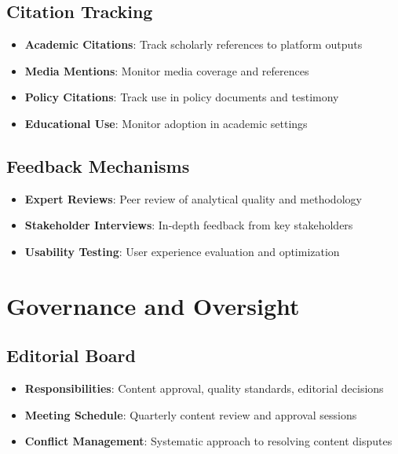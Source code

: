 \documentclass[11pt,a4paper]{article}
\begin{document}
\subsection{Citation Tracking}
\begin{itemize}
    \item \textbf{Academic Citations}: Track scholarly references to platform outputs
    \item \textbf{Media Mentions}: Monitor media coverage and references
    \item \textbf{Policy Citations}: Track use in policy documents and testimony
    \item \textbf{Educational Use}: Monitor adoption in academic settings
\end{itemize}

\subsection{Feedback Mechanisms}
\begin{itemize}
    \textbf{User Surveys}: Regular satisfaction and needs assessment surveys
    \item \textbf{Expert Reviews}: Peer review of analytical quality and methodology
    \item \textbf{Stakeholder Interviews}: In-depth feedback from key stakeholders
    \item \textbf{Usability Testing}: User experience evaluation and optimization
\end{itemize}

\section{Governance and Oversight}

\subsection{Editorial Board}
\begin{itemize}
    \textbf{Composition}: Senior economists, methodologists, subject matter experts
    \item \textbf{Responsibilities}: Content approval, quality standards, editorial decisions
    \item \textbf{Meeting Schedule}: Quarterly content review and approval sessions
    \item \textbf{Conflict Management}: Systematic approach to resolving content disputes
\end{itemize}
\end{document}
